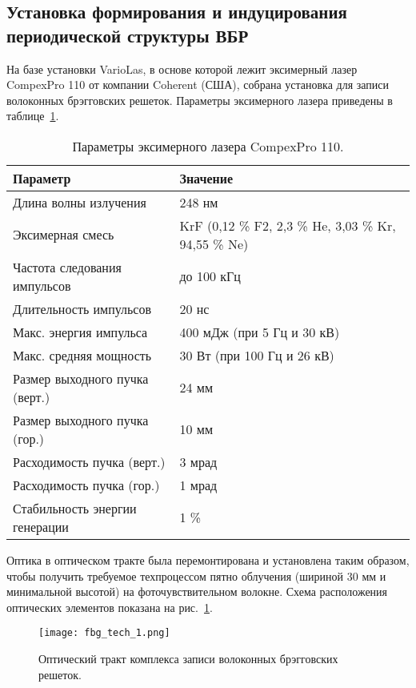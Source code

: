 \subsection{Установка формирования и индуцирования периодической структуры ВБР}
\label{sub:fbg_exper_compex}

На базе установки VarioLas, в основе которой лежит эксимерный лазер CompexPro 110 от компании Coherent (США), собрана установка для записи волоконных брэгговских решеток. Параметры эксимерного лазера приведены в таблице~\ref{tbl:nrl_1}.

\begin{table}
  \centering
  \parbox{15cm}{\caption{Параметры эксимерного лазера CompexPro 110.}\label{tbl:nrl_1}}
  \begin{tabular}{| p{6cm} | p{9cm} |}
  \hline
        Параметр  & Значение \\
  \hline
  \hline
        Длина волны излучения &  248 нм \\
        Эксимерная смесь &  KrF (0,12 \% F2, 2,3 \% He, 3,03 \% Kr, 94,55 \% Ne) \\
        Частота следования импульсов &  до 100 кГц \\
        Длительность импульсов &  20 нс \\
        Макс. энергия импульса &  400 мДж (при 5 Гц и 30 кВ) \\
        Макс. средняя мощность &  30 Вт (при 100 Гц и 26 кВ) \\
        Размер выходного пучка (верт.) &  24 мм \\
        Размер выходного пучка (гор.) &  10 мм \\
        Расходимость пучка (верт.) &  3 мрад \\
        Расходимость пучка (гор.) &  1 мрад \\
        Стабильность энергии генерации &  1 \% \\
  \hline
  \end{tabular}
\end{table}

Оптика в оптическом тракте была перемонтирована и установлена таким образом, чтобы получить требуемое техпроцессом пятно облучения (шириной 30 мм и минимальной высотой) на фоточувствительном волокне. Схема расположения оптических элементов показана на рис.~\ref{img:fbg_tech_1}.

\begin{figure}[ht]
  \centering
  \texttt{[image: fbg\_tech\_1.png]}
  \caption{Оптический тракт комплекса записи волоконных брэгговских решеток.}
  \label{img:fbg_tech_1}
\end{figure}

